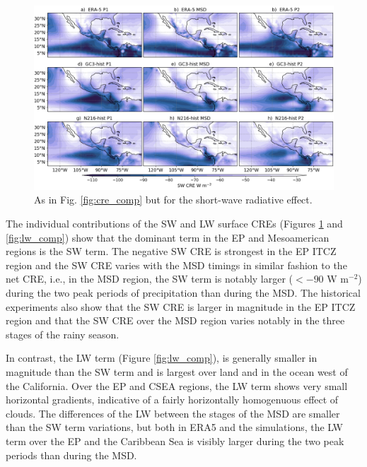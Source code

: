 \begin{figure}[t!]
\includegraphics[width=\linewidth]{figures/fig4_swclim_3.png}
\caption[Short-wave cloud radiative effect composites]{As in Fig. \ref{fig:cre_comp} but for the short-wave radiative effect.}
\label{fig:sw_comp}
\end{figure}

The individual contributions of the SW and LW surface CREs (Figures \ref{fig:sw_comp} and \ref{fig:lw_comp}) show that the dominant term in the EP and Mesoamerican regions is the SW term. The negative SW CRE is strongest in the EP ITCZ region and the SW CRE varies with the MSD timings in similar fashion to the net CRE, i.e., in the MSD region, the SW term is notably larger ($<-90$ W m$^{-2}$) during the two peak periods of precipitation than during the MSD.
The historical experiments also show that the SW CRE is larger in magnitude in the EP ITCZ region and that the SW CRE over the MSD region varies notably in the three stages of the rainy season.

In contrast, the LW term (Figure \ref{fig:lw_comp}), is generally smaller in magnitude than the SW term and is largest over land and in the ocean west of the California. Over the EP and CSEA regions, the LW term shows very small horizontal gradients, indicative of a fairly horizontally homogenuous effect of clouds. 
The differences of the LW between the stages of the MSD are smaller than the SW term variations, but both in ERA5 and the simulations, the LW term over the EP and the Caribbean Sea is visibly larger during the two peak periods than during the MSD. 

